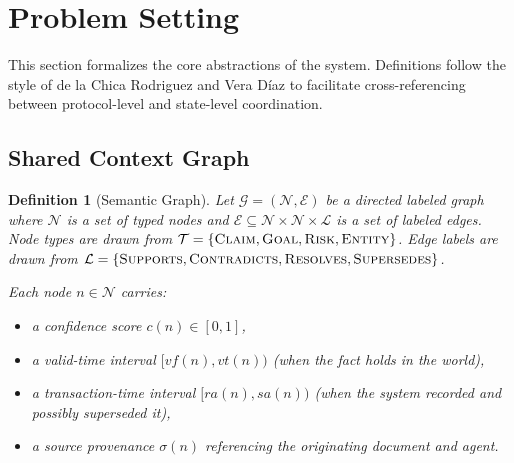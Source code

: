 \documentclass[11pt]{article}
\newtheorem{definition}{Definition}
\begin{document}
\section{Problem Setting}
\label{sec:problem-setting}

This section formalizes the core abstractions of the system. Definitions follow the style of de la Chica Rodriguez and Vera D\'{i}az \cite{delachica2026} to facilitate cross-referencing between protocol-level and state-level coordination.

\subsection{Shared Context Graph}

\begin{definition}[Semantic Graph]
\label{def:graph}
Let $\mathcal{G} = (\mathcal{N}, \mathcal{E})$ be a directed labeled graph where $\mathcal{N}$ is a set of typed nodes and $\mathcal{E} \subseteq \mathcal{N} \times \mathcal{N} \times \mathcal{L}$ is a set of labeled edges. Node types are drawn from $\mathcal{T} = \{\textnormal{\textsc{Claim}}, \textnormal{\textsc{Goal}}, \textnormal{\textsc{Risk}}, \textnormal{\textsc{Entity}}\}$. Edge labels are drawn from $\mathcal{L} = \{\textnormal{\textsc{Supports}}, \textnormal{\textsc{Contradicts}}, \textnormal{\textsc{Resolves}}, \textnormal{\textsc{Supersedes}}\}$.

Each node $n \in \mathcal{N}$ carries:
\begin{itemize}
  \item a confidence score $c(n) \in [0,1]$,
  \item a valid-time interval $[\textit{vf}(n), \textit{vt}(n))$ (when the fact holds in the world),
  \item a transaction-time interval $[\textit{ra}(n), \textit{sa}(n))$ (when the system recorded and possibly superseded it),
  \item a source provenance $\sigma(n)$ referencing the originating document and agent.
\end{itemize}
\end{definition}
\end{document}
